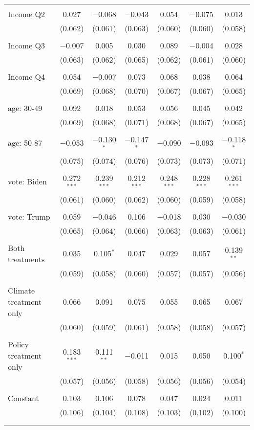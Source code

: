 \begin{tabular}{@{\extracolsep{5pt}}lcccccc}
  & & & & & & \\ 
 Income Q2 & 0.027 & $-$0.068 & $-$0.043 & 0.054 & $-$0.075 & 0.013 \\ 
  & (0.062) & (0.061) & (0.063) & (0.060) & (0.060) & (0.058) \\ 
  & & & & & & \\ 
 Income Q3 & $-$0.007 & 0.005 & 0.030 & 0.089 & $-$0.004 & 0.028 \\ 
  & (0.063) & (0.062) & (0.065) & (0.062) & (0.061) & (0.060) \\ 
  & & & & & & \\ 
 Income Q4 & 0.054 & $-$0.007 & 0.073 & 0.068 & 0.038 & 0.064 \\ 
  & (0.069) & (0.068) & (0.070) & (0.067) & (0.067) & (0.065) \\ 
  & & & & & & \\ 
 age: 30-49 & 0.092 & 0.018 & 0.053 & 0.056 & 0.045 & 0.042 \\ 
  & (0.069) & (0.068) & (0.071) & (0.068) & (0.067) & (0.065) \\ 
  & & & & & & \\ 
 age: 50-87 & $-$0.053 & $-$0.130$^{*}$ & $-$0.147$^{*}$ & $-$0.090 & $-$0.093 & $-$0.118$^{*}$ \\ 
  & (0.075) & (0.074) & (0.076) & (0.073) & (0.073) & (0.071) \\ 
  & & & & & & \\ 
 vote: Biden & 0.272$^{***}$ & 0.239$^{***}$ & 0.212$^{***}$ & 0.248$^{***}$ & 0.228$^{***}$ & 0.261$^{***}$ \\ 
  & (0.061) & (0.060) & (0.062) & (0.060) & (0.059) & (0.058) \\ 
  & & & & & & \\ 
 vote: Trump & 0.059 & $-$0.046 & 0.106 & $-$0.018 & 0.030 & $-$0.030 \\ 
  & (0.065) & (0.064) & (0.066) & (0.063) & (0.063) & (0.061) \\ 
  & & & & & & \\ 
 Both treatments & 0.035 & 0.105$^{*}$ & 0.047 & 0.029 & 0.057 & 0.139$^{**}$ \\ 
  & (0.059) & (0.058) & (0.060) & (0.057) & (0.057) & (0.056) \\ 
  & & & & & & \\ 
 Climate treatment only & 0.066 & 0.091 & 0.075 & 0.055 & 0.065 & 0.067 \\ 
  & (0.060) & (0.059) & (0.061) & (0.058) & (0.058) & (0.057) \\ 
  & & & & & & \\ 
 Policy treatment only & 0.183$^{***}$ & 0.111$^{**}$ & $-$0.011 & 0.015 & 0.050 & 0.100$^{*}$ \\ 
  & (0.057) & (0.056) & (0.058) & (0.056) & (0.056) & (0.054) \\ 
  & & & & & & \\ 
 Constant & 0.103 & 0.106 & 0.078 & 0.047 & 0.024 & 0.011 \\ 
  & (0.106) & (0.104) & (0.108) & (0.103) & (0.102) & (0.100) \\ 
  & & & & & & \\ 
\hline \\[-1.8ex] 


\end{tabular}
